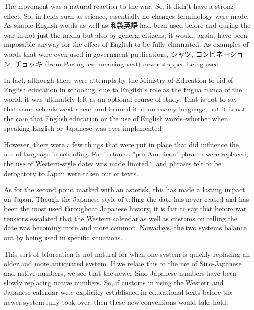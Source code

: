 \par{ The movement was a natural reaction to the war. So, it didn't have a strong effect. So, in fields such as science, essentially no changes terminology were made. As simple English words as well as 和製英語 had been used before and during the war in not just the media but also by general citizens, it would, again, have been impossible anyway for the effect of English to be fully eliminated. As examples of words that were even used in government publications, シャツ, コンビネーション, チョッキ (from Portuguese meaning vest) never stopped being used. }

\par{ In fact, although there were attempts by the Ministry of Education to rid of English education in schooling, due to English's role as the lingua franca of the world, it was ultimately left as an optional course of study. That is not to say that some schools went ahead and banned it as an enemy language, but it is not the case that English education or the use of English words--whether when speaking English or Japanese--was ever implemented. }

\par{ However, there were a few things that were put in place that did influence the use of language in schooling. For instance, "pro-American" phrases were replaced, the use of Western-style dates was made limited*, and phrases felt to be derogatory to Japan were taken out of texts. }

\par{ As for the second point marked with an asterisk, this has made a lasting impact on Japan. Though the Japanese-style of telling the date has never ceased and has been the most used throughout Japanese history, it is fair to say that before war tensions escalated that the Western calendar as well as customs on telling the date was becoming more and more common. Nowadays, the two systems balance out by being used in specific situations. }

\par{ This sort of bifurcation is not natural for when one system is quickly replacing an older and more antiquated system. If we relate this to the use of Sino-Japanese and native numbers, we see that the newer Sino-Japanese numbers have been slowly replacing native numbers. So, if customs in using the Western and Japanese calendar were explicitly established in educational texts before the newer system fully took over, then these new conventions would take hold. }

